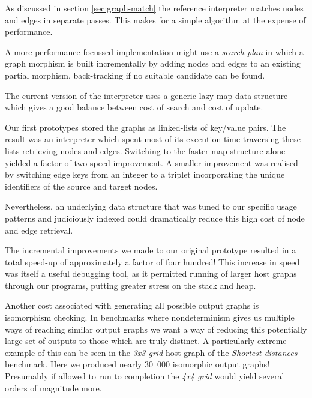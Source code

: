 As discussed in section \ref{sec:graph-match} the reference interpreter matches nodes and edges in separate passes. This makes for a simple algorithm at the expense of performance.

A more performance focussed implementation might use a \textit{search plan}\cite{Horvath-Varro07} in which a graph morphism is built incrementally by adding nodes and edges to an existing partial morphism, back-tracking if no suitable candidate can be found.



The current version of the interpreter uses a generic lazy map data structure which gives a good balance between cost of search and cost of update. 

Our first prototypes stored the graphs as linked-lists of key/value pairs. The result was an interpreter which spent most of its execution time traversing these lists retrieving nodes and edges. Switching to the faster map structure alone yielded a factor of two speed improvement. A smaller improvement was realised by switching edge keys from an integer to a triplet incorporating the unique identifiers of the source and target nodes.

Nevertheless, an underlying data structure that was tuned to our specific usage patterns and judiciously indexed could dramatically reduce this high cost of node and edge retrieval.

The incremental improvements we made to our original prototype resulted in a total speed-up of approximately a factor of four hundred! This increase in speed was itself a useful debugging tool, as it permitted running of larger host graphs through our programs, putting greater stress on the stack and heap.


Another cost associated with generating all possible output graphs is isomorphism checking. In benchmarks where nondeterminism gives us multiple ways of reaching similar output graphs we want a way of reducing this potentially large set of outputs to those which are truly distinct. A particularly extreme example of this can be seen in the \textit{3x3 grid} host graph of the \textit{Shortest distances} benchmark. Here we produced nearly 30~000 isomorphic output graphs! Presumably if allowed to run to completion the \textit{4x4 grid} would yield several orders of magnitude more.


